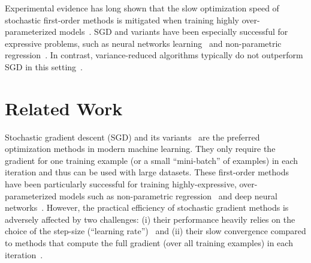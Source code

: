 Experimental evidence has long shown that the slow optimization speed of stochastic first-order methods is mitigated when training highly over-parameterized models~\citep{bottou2010largescale, }.
\ac{SGD} and variants have been especially successful for expressive problems, such as neural networks learning~\citep{zhang2013gradient, bengio2012practical} and non-parametric regression~\citep{liang2018just, belkin2019datainterp}.
In contrast, variance-reduced algorithms typically do not outperform \ac{SGD} in this setting~\citep{defazio2019effectiveness}. 




\section{Related Work}


\newpage

Stochastic gradient descent (SGD) and its variants~\cite{duchi2011adagrad,zeiler2012adadelta,kingma2015adam,tieleman2012rmsprop,schmidt2017sag,johnson2013svrg,defazio2014saga} are the preferred optimization methods in modern machine learning. They only require the gradient for one training example (or a small ``mini-batch'' of examples) in each iteration and thus can be used with large datasets. These first-order methods have been particularly successful for training highly-expressive, over-parameterized models such as non-parametric regression~\cite{liang2018just,belkin2019does} and deep neural networks~\cite{bengio2012practical,zhang2016understanding}. However, the practical efficiency of stochastic gradient methods is adversely affected by two challenges: (i) their performance heavily relies on the choice of the step-size (``learning rate'')~\cite{bengio2012practical, schaul2013no} and (ii) their slow convergence compared to methods that compute the full gradient (over all training examples) in each iteration~\cite{nesterov2013introductory}. 


